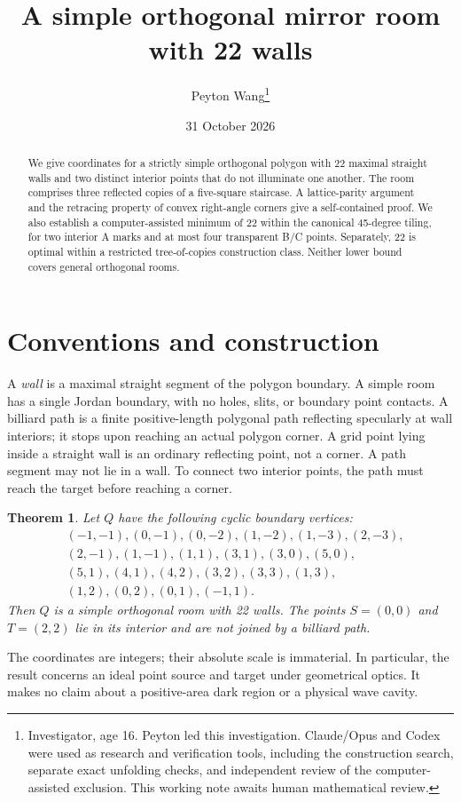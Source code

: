 \documentclass[11pt]{article}
\title{A simple orthogonal mirror room with 22 walls}
\author{Peyton Wang\thanks{Investigator, age 16. Peyton led this investigation. Claude/Opus and Codex were used as research and verification tools, including the construction search, separate exact unfolding checks, and independent review of the computer-assisted exclusion. This working note awaits human mathematical review. }}
\date{31 October 2026}
\newtheorem{theorem}{Theorem}
\theoremstyle{definition}\newtheorem{definition}[theorem]{Definition}
\begin{document}
\maketitle
\begin{abstract}
We give coordinates for a strictly simple orthogonal polygon with 22 maximal straight walls and two distinct interior points that do not illuminate one another. The room comprises three reflected copies of a five-square staircase. A lattice-parity argument and the retracing property of convex right-angle corners give a self-contained proof. We also establish a computer-assisted minimum of 22 within the canonical 45-degree tiling, for two interior A marks and at most four transparent B/C points. Separately, 22 is optimal within a restricted tree-of-copies construction class. Neither lower bound covers general orthogonal rooms.
\end{abstract}

\section{Conventions and construction}
A \emph{wall} is a maximal straight segment of the polygon boundary. A simple room has a single Jordan boundary, with no holes, slits, or boundary point contacts. A billiard path is a finite positive-length polygonal path reflecting specularly at wall interiors; it stops upon reaching an actual polygon corner. A grid point lying inside a straight wall is an ordinary reflecting point, not a corner. A path segment may not lie in a wall. To connect two interior points, the path must reach the target before reaching a corner.

\begin{theorem}\label{thm:room}
Let $Q$ have the following cyclic boundary vertices:
\begin{align*}
&(-1,-1),(0,-1),(0,-2),(1,-2),(1,-3),(2,-3),\\
&(2,-1),(1,-1),(1,1),(3,1),(3,0),(5,0),\\
&(5,1),(4,1),(4,2),(3,2),(3,3),(1,3),\\
&(1,2),(0,2),(0,1),(-1,1).
\end{align*}
Then $Q$ is a simple orthogonal room with 22 walls. The points $S=(0,0)$ and $T=(2,2)$ lie in its interior and are not joined by a billiard path.
\end{theorem}

The coordinates are integers; their absolute scale is immaterial. In particular, the result concerns an ideal point source and target under geometrical optics. It makes no claim about a positive-area dark region or a physical wave cavity.
\end{document}
